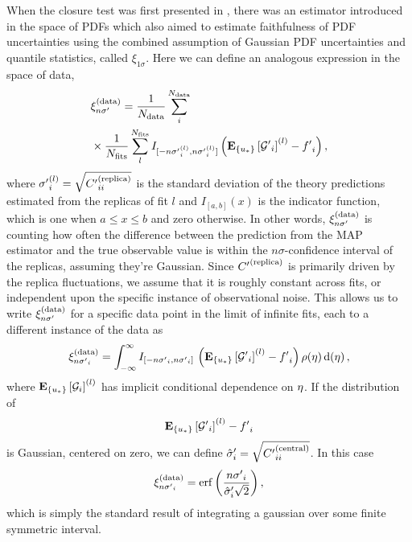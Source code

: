 When the closure test was first presented in \cite{nnpdf30}, there was an
estimator introduced in the space of PDFs which also aimed to estimate
faithfulness of PDF uncertainties using the combined assumption of Gaussian PDF
uncertainties and quantile statistics, called $\xi_{1\sigma}$. Here we can
define an analogous expression in the space of data,
\begin{align}
    \label{eq:XiDataDef}
    &\xi^{(\rm data)}_{n {{\sigma}^{\prime}}} = 
        \frac{1}{N_{\rm data}} \sum_{i}^{N_{\rm data}} \nonumber\\
        &\times\frac{1}{N_{\rm fits}} \sum_{l}^{N_{\rm fits}}
            I_{[-n {{\sigma}^{\prime}}_i^{(l)}, n {{\sigma}^{\prime}}_i^{(l)}]}
            \left( \mathbf{E}_{\{ u_* \}} \left[ {{\mathcal{G}}^{\prime}}_i \right]^{(l)} - {{f}^{\prime}}_i \right),
\end{align}
where ${{\sigma}^{\prime}}_i^{(l)} = \sqrt{{{C}^{\prime}}^{(\rm replica)}_{ii}}$ is the standard deviation
of the theory predictions estimated from the replicas of fit $l$ and $I_{[a,
b]}(x)$ is the indicator function, which is one when $a \leq x \leq b$ and zero
otherwise. In other words, $\xi^{(\rm data)}_{n {{\sigma}^{\prime}}}$ is counting how often the difference
between the prediction from the MAP estimator and the true observable value is
within the $n\sigma$-confidence interval of the replicas, assuming they're
Gaussian. Since ${{C}^{\prime}}^{(\rm replica)}$ is primarily driven by the replica fluctuations, we
assume that it is roughly constant across fits, or independent upon the specific
instance of observational noise. This allows us to write $\xi^{(\rm data)}_{n {{\sigma}^{\prime}}}$ for a
specific data point in the limit of infinite fits, each to a different instance
of the data as
%
\begin{equation}
    \label{eq:XiIExpecVel}
        \xi^{(\rm data)}_{n {{{\sigma}^{\prime}}_i}} =
            \int_{-\infty}^{\infty} I_{[-n {{\sigma}^{\prime}}_i, n {{\sigma}^{\prime}}_i]}\,
            \left( \mathbf{E}_{\{ u_* \}} \left[ {{\mathcal{G}}^{\prime}}_i \right]^{(l)} - {{f}^{\prime}}_i \right) 
            \rho(\eta) \, 
            {\rm d}(\eta) \, ,
\end{equation}
%
where $\mathbf{E}_{\{ u_* \}} \left[ \mathcal{G}_i \right]^{(l)}$ has implicit conditional dependence on
$\eta$. 
If the distribution of 
$$\mathbf{E}_{\{ u_* \}} \left[ {{\mathcal{G}}^{\prime}}_i \right]^{(l)} - {{f}^{\prime}}_i$$ is Gaussian, centered
on zero, we can define ${{{ \hat{\sigma} }^{\prime}}}_i = \sqrt{{{C}^{\prime}}^{(\rm central)}_{ii}}$. In
this case
\begin{equation}
    \label{eq:expectedxi}
    \xi^{(\rm data)}_{n {{{\sigma}^{\prime}}_i}} =
    {\rm erf} \left( \frac{n {{\sigma}^{\prime}}_i}{{{\hat{\sigma}}^{\prime}}_i \sqrt{2}}\right),
\end{equation}
which is simply the standard result of integrating a gaussian over some finite
symmetric interval.


